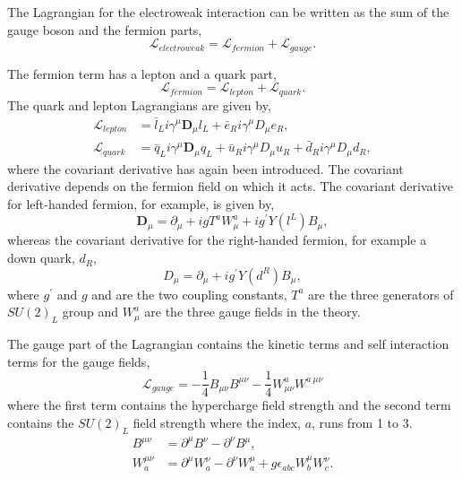 The Lagrangian for the electroweak interaction can be written as the sum of the
gauge boson and the fermion parts,
\begin{equation}
\mathcal{L}_{electroweak} = 
\mathcal{L}_{fermion}
+ \mathcal{L}_{gauge}.
\end{equation}

The fermion term has a lepton and a quark part,
\begin{equation}
\mathcal{L}_{fermion} =
 \mathcal{L}_{lepton}
+ \mathcal{L}_{quark}.
\end{equation}
The quark and lepton Lagrangians are given by,
\begin{align*}
\mathcal{L}_{lepton} &= 
\bar{l}_{L} i \gamma^{\mu} \mathbf{D}_{\mu} l_{L} +
\bar{e}_{R} i \gamma^{\mu} D_{\mu} e_{R}, \\
\mathcal{L}_{quark} &= 
\bar{q}_{L} i \gamma^{\mu} \mathbf{D}_{\mu} q_{L} +
\bar{u}_{R} i \gamma^{\mu} D_{\mu} u_{R} +
\bar{d}_{R} i \gamma^{\mu} D_{\mu} d_{R},
\end{align*}
where the covariant derivative has again been introduced.
The covariant derivative depends on the fermion field on which it acts. The covariant derivative
for left-handed fermion, for example, is given by,
\begin{equation}
\mathbf{D}_\mu 
= \partial_\mu 
+ ig{T}^{a}W_{\mu}^{a}
+ ig^{\prime}Y(l^{L})B_{\mu},
\end{equation}
whereas the covariant derivative for the right-handed fermion, for example a
down quark, $d_R$,
\begin{equation}
D_\mu = \partial_\mu + ig^{\prime}Y(d^{R})B_{\mu},
\end{equation}
where $g^\prime$ and $g$ and are the two coupling constants,
${T}^{a}$ are the three generators of $SU(2)_L$ group and $W^{a}_{\mu}$ are
the three gauge fields in the theory.

The gauge part of the Lagrangian contains the kinetic terms and self interaction
terms for the gauge fields,
\begin{equation}
\mathcal{L}_{gauge} = 
- \frac{1}{4} B_{\mu\nu} B^{\mu\nu}
- \frac{1}{4} W^{a}_{\mu\nu} W^{a~\mu\nu}
\end{equation}
where the first term contains the hypercharge field strength and the second term 
contains the $SU(2)_L$ field strength where the index, $a$, runs from 1 to 3.
\begin{align*}
B^{\mu\nu}     &= \partial^{\mu} B^{\nu} - \partial^{\nu} B^{\mu},\\
W_{a}^{\mu\nu} &= \partial^{\mu} W_{a}^{\nu} - \partial^{\nu} W_{a}^{\mu} 
                + g \epsilon_{abc} W_{b}^{\mu} W_{c}^{\nu}.
\end{align*}

